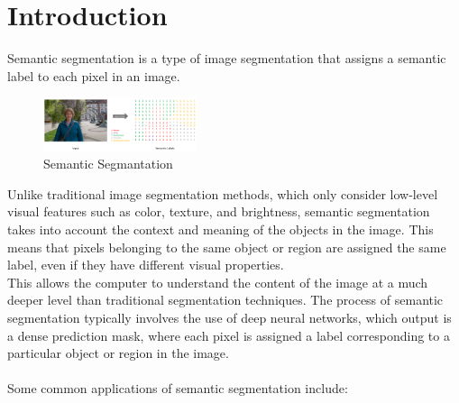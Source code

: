 \documentclass{article}
\begin{document}
\section{Introduction}\label{sec:introduction}
Semantic segmentation is a type of image segmentation that assigns a semantic label to each pixel in an image.\\
\begin{figure}[H]
    \begin{center}
    \includegraphics[width=0.4\textwidth]{img/SemanticSegmentation.png}
    \caption{Semantic Segmantation}
    \label{fig:semanticSegmentation}
    \end{center}
\end{figure}Unlike traditional image segmentation methods, which only consider low-level visual features such as color, texture, and brightness, semantic segmentation takes into account the context and meaning of the objects in the image. This means that pixels belonging to the same object or region are assigned the same label, even if they have different visual properties.\\
This allows the computer to understand the content of the image at a much deeper level than traditional segmentation techniques.
The process of semantic segmentation typically involves the use of deep neural networks, which output is a dense prediction mask, where each pixel is assigned a label corresponding to a particular object or region in the image.\\\\
Some common applications of semantic segmentation include:
\end{document}
